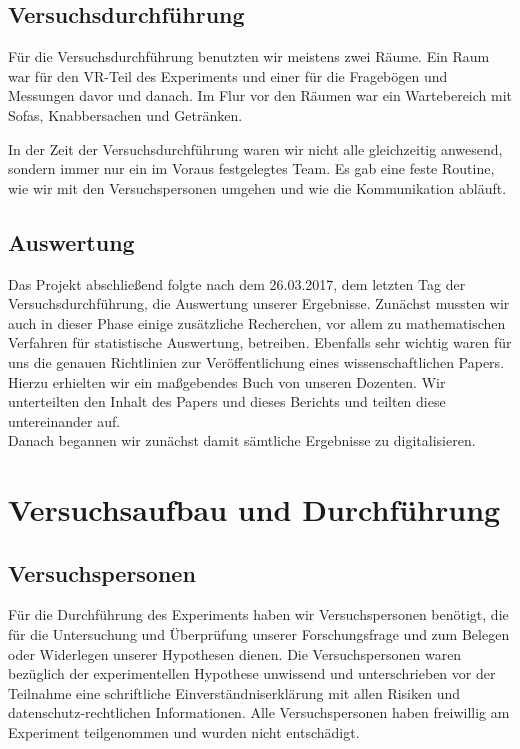 \documentclass{Bericht}
\begin{document}
	\subsection{Versuchsdurchführung} %
		Für die Versuchsdurchführung benutzten wir meistens zwei Räume. Ein Raum war für den VR-Teil des Experiments und einer für die Fragebögen und Messungen davor und danach. Im Flur vor den Räumen war ein Wartebereich mit Sofas, Knabbersachen und Getränken. 
		
		In der Zeit der Versuchsdurchführung waren wir nicht alle gleichzeitig anwesend, sondern immer nur ein im Voraus festgelegtes Team. Es gab eine feste Routine, wie wir mit den Versuchspersonen umgehen und wie die Kommunikation abläuft. 		
	\subsection{Auswertung} %
		Das Projekt abschließend folgte nach dem 26.03.2017, dem letzten Tag der Versuchsdurchführung, die Auswertung unserer Ergebnisse.
		Zunächst mussten wir auch in dieser Phase einige zusätzliche Recherchen, vor allem zu mathematischen Verfahren für statistische Auswertung, betreiben. Ebenfalls sehr wichtig waren für uns die genauen Richtlinien zur Veröffentlichung eines wissenschaftlichen Papers. Hierzu erhielten wir ein maßgebendes Buch von unseren Dozenten. Wir unterteilten den Inhalt des Papers und dieses Berichts und teilten diese untereinander auf.\\
		Danach begannen wir zunächst damit sämtliche Ergebnisse zu digitalisieren.

\clearpage
\section{Versuchsaufbau und Durchführung} %
	\subsection{Versuchspersonen}
Für die Durchführung des Experiments haben wir Versuchspersonen benötigt, die für die Untersuchung und Überprüfung unserer Forschungsfrage und zum Belegen oder Widerlegen unserer Hypothesen dienen. 
Die Versuchspersonen waren bezüglich der experimentellen Hypothese unwissend und unterschrieben vor der Teilnahme eine schriftliche Einverständniserklärung mit allen Risiken und datenschutz-rechtlichen Informationen. Alle Versuchspersonen haben freiwillig am Experiment teilgenommen und wurden nicht entschädigt. 
\end{document}
